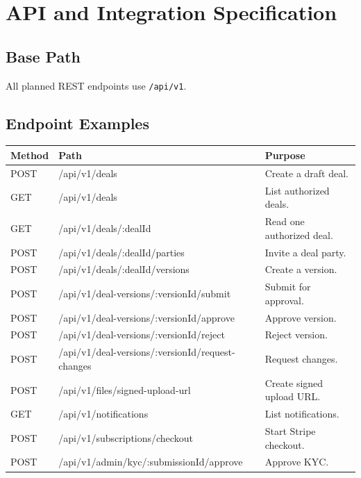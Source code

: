 \chapter{API and Integration Specification}
\section{Base Path}
All planned REST endpoints use \texttt{/api/v1}.
\section{Endpoint Examples}
\begin{longtable}{p{}p{}p{}}
\toprule
Method & Path & Purpose \\
\midrule
POST & /api/v1/deals & Create a draft deal. \\
GET & /api/v1/deals & List authorized deals. \\
GET & /api/v1/deals/:dealId & Read one authorized deal. \\
POST & /api/v1/deals/:dealId/parties & Invite a deal party. \\
POST & /api/v1/deals/:dealId/versions & Create a version. \\
POST & /api/v1/deal-versions/:versionId/submit & Submit for approval. \\
POST & /api/v1/deal-versions/:versionId/approve & Approve version. \\
POST & /api/v1/deal-versions/:versionId/reject & Reject version. \\
POST & /api/v1/deal-versions/:versionId/request-changes & Request changes. \\
POST & /api/v1/files/signed-upload-url & Create signed upload URL. \\
GET & /api/v1/notifications & List notifications. \\
POST & /api/v1/subscriptions/checkout & Start Stripe checkout. \\
POST & /api/v1/admin/kyc/:submissionId/approve & Approve KYC. \\
\bottomrule
\end{longtable}

